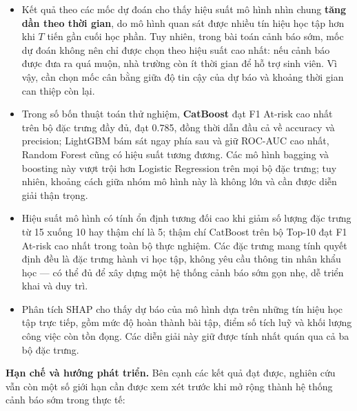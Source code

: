 \documentclass[a4paper]{report}
\begin{document}
\begin{itemize}[leftmargin=*]
  \item Kết quả theo các mốc dự đoán cho thấy hiệu suất mô hình nhìn chung
        \textbf{tăng dần theo thời gian}, do mô hình quan sát được nhiều tín
        hiệu học tập hơn khi $T$ tiến gần cuối học phần. Tuy nhiên, trong bài
        toán cảnh báo sớm, mốc dự đoán không nên chỉ được chọn theo hiệu suất
        cao nhất: nếu cảnh báo được đưa ra quá muộn, nhà trường còn ít thời
        gian để hỗ trợ sinh viên. Vì vậy, cần chọn mốc cân bằng giữa độ tin cậy
        của dự báo và khoảng thời gian can thiệp còn lại.
  \item Trong số bốn thuật toán thử nghiệm, \textbf{CatBoost} đạt F1 At-risk
        cao nhất trên bộ đặc trưng đầy đủ, đạt 0.785, đồng thời dẫn đầu cả về
        accuracy và precision; LightGBM bám sát ngay phía sau và giữ ROC-AUC
        cao nhất, Random Forest cũng có hiệu suất tương đương. 
        Các mô hình bagging và boosting này vượt trội hơn Logistic Regression
        trên mọi bộ đặc trưng; tuy nhiên, khoảng cách giữa nhóm mô hình này là 
        không lớn và cần được diễn giải thận trọng.
  \item Hiệu suất mô hình có tính ổn định tương đối cao khi giảm số lượng đặc trưng từ
        15 xuống 10 hay thậm chí là 5; thậm chí CatBoost trên bộ Top-10 đạt F1 At-risk cao nhất
        trong toàn bộ thực nghiệm. Các đặc trưng mang tính quyết định đều là đặc trưng hành vi học
        tập, không yêu cầu thông tin nhân khẩu học --- có thể đủ để xây dựng
        một hệ thống cảnh báo sớm gọn nhẹ, dễ triển khai và duy trì.
  \item Phân tích SHAP cho thấy dự báo của mô hình dựa trên những tín hiệu học
        tập trực tiếp, gồm mức độ hoàn thành bài tập, điểm số tích luỹ và khối
        lượng công việc còn tồn đọng. Các diễn giải này giữ được
        tính nhất quán qua cả ba bộ đặc trưng.
\end{itemize}

\textbf{Hạn chế và hướng phát triển.} Bên cạnh các kết quả đạt được, nghiên
cứu vẫn còn một số giới hạn cần được xem xét trước khi mở rộng thành hệ thống
cảnh báo sớm trong thực tế:
\end{document}
